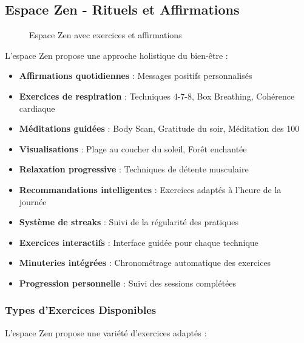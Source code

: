 \documentclass[12pt,a4paper]{article}
\begin{document}
\subsection{Espace Zen - Rituels et Affirmations}

\begin{figure}[H]
    \centering
    \caption{Espace Zen avec exercices et affirmations}
\end{figure}

L'espace Zen propose une approche holistique du bien-être :

\begin{itemize}
    \item \textbf{Affirmations quotidiennes} : Messages positifs personnalisés
    \item \textbf{Exercices de respiration} : Techniques 4-7-8, Box Breathing, Cohérence cardiaque
    \item \textbf{Méditations guidées} : Body Scan, Gratitude du soir, Méditation des 100
    \item \textbf{Visualisations} : Plage au coucher du soleil, Forêt enchantée
    \item \textbf{Relaxation progressive} : Techniques de détente musculaire
    \item \textbf{Recommandations intelligentes} : Exercices adaptés à l'heure de la journée
    \item \textbf{Système de streaks} : Suivi de la régularité des pratiques
    \item \textbf{Exercices interactifs} : Interface guidée pour chaque technique
    \item \textbf{Minuteries intégrées} : Chronométrage automatique des exercices
    \item \textbf{Progression personnelle} : Suivi des sessions complétées
\end{itemize}

\subsubsection{Types d'Exercices Disponibles}

L'espace Zen propose une variété d'exercices adaptés :
\end{document}
